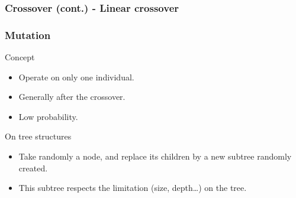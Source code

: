 \begin{frame}
  \frametitle{Crossover (cont.) - Linear crossover}
  \begin{figure}[ht]
    \centering
  \end{figure}
\end{frame}

\begin{frame}
  \frametitle{Mutation}
  \begin{block}{Concept}
    \begin{itemize}
    \item Operate on only one individual.
    \item Generally after the crossover.
    \item Low probability.
    \end{itemize}
  \end{block}

  \begin{block}{On tree structures}
    \begin{itemize}
    \item Take randomly a node, and replace its children by a new subtree
      randomly created.
    \item This subtree respects the limitation (size, depth\dots) on
      the tree.
    \end{itemize}
  \end{block}
\end{frame}

